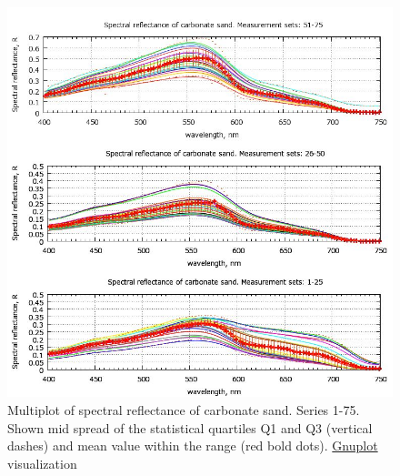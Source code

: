 \documentclass[10pt, a4paper]{article}
\begin{document}
\begin{figure}
	\begin{center}
		\includegraphics[scale=0.5]{GNU-16.jpg}
		\caption{Multiplot of spectral reflectance of carbonate sand. Series 1-75. Shown mid spread of the statistical quartiles Q1 and Q3 (vertical dashes) and
			mean value within the range (red bold dots). \href{http://www.gnuplot.info/}{Gnuplot} visualization­}
		\label{fig:4.14}
	\end{center}
\end{figure}
\end{document}

